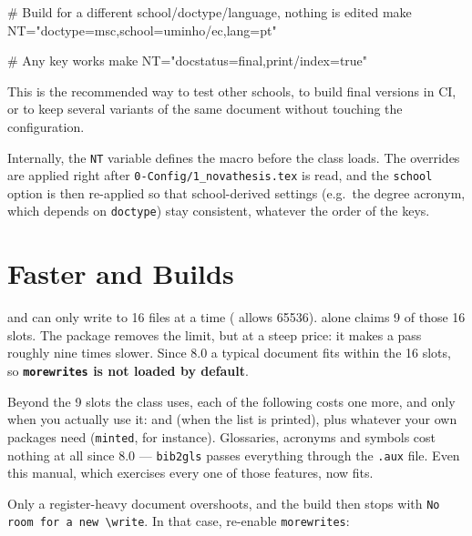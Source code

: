 \begin{bashcode}
# Build for a different school/doctype/language, nothing is edited
make NT="doctype=msc,school=uminho/ec,lang=pt"

# Any \ntsetup key works
make NT="docstatus=final,print/index=true"
\end{bashcode}

This is the recommended way to test other schools, to build final versions
in \gls{CI}, or to keep several variants of the same document without
touching the configuration.

Internally, the \verb!NT! variable defines the macro
\latexinline{\ntoverride} before the class loads.  The overrides are applied
right after \verb!0-Config/1_novathesis.tex! is read, and the
\texttt{school} option is then re-applied so that school-derived settings
(e.g.\ the degree acronym, which depends on \texttt{doctype}) stay
consistent, whatever the order of the keys.


\section{Faster  and  Builds}
\label{sec:build_fastwrites}

 and  can only write to 16 files at a time
( allows 65536).  \novathesis{} alone claims 9 of those 16
slots.  The  package removes
the limit, but at a steep price: it makes a  pass roughly
nine times slower.  Since 8.0 a typical document fits within the 16 slots, so
\textbf{\texttt{morewrites} is not loaded by default}.

Beyond the 9 slots the class uses, each of the following costs one more, and
only when you actually use it: \latexinline{\listofalgorithms} and
\latexinline{\listoflistings} (when the list is printed), plus whatever your
own packages need (\texttt{minted}, for instance).  Glossaries, acronyms and
symbols cost nothing at all since 8.0 --- \texttt{bib2gls} passes everything
through the \texttt{.aux} file.  Even this manual, which exercises every one
of those features, now fits.

Only a register-heavy document overshoots, and the build then stops with
\texttt{No room for a new \textbackslash write}.  In that case, re-enable
\texttt{morewrites}:

